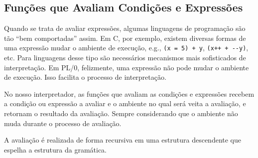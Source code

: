 \documentclass{scrartcl}
\begin{document}
\subsection{Funções que Avaliam Condições e Expressões}
\label{sec:org1d5c614}

Quando se trata de avaliar expressões, algumas linguagens de programação são tão
“bem comportadas” assim. Em C, por exemplo, existem diversas formas de uma
expressão mudar o ambiente de execução, e.g., \texttt{(x = 5) + y}, \texttt{(x++ + -{}-{}y)}, etc.
Para linguagens desse tipo são necessários mecanismos mais sofisticados de
interpretação. Em PL/0, felizmente, uma expressão não pode mudar o ambiente de
execução. Isso facilita o processo de interpretação.

No nosso interpretador, as funções que avaliam as condições e expressões recebem
a condição ou expressão a avaliar e o ambiente no qual será veita a avaliação, e
retornam o resultado da avaliação. Sempre considerando que o ambiente não muda
durante o processo de avaliação.

A avaliação é realizada de forma recursiva em uma estrutura descendente que
espelha a estrutura da gramática.
\end{document}
